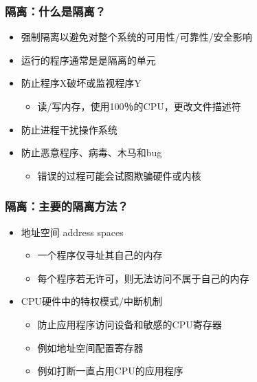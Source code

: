 \begin{frame}
	\frametitle{隔离：\small{什么是隔离？}}
		\begin{itemize}

		\item 强制隔离以避免对整个系统的可用性/可靠性/安全影响
		\item 运行的程序通常是是隔离的单元
		\pause
		
		\item 防止程序X破坏或监视程序Y
			\begin{itemize}
			\item 读/写内存，使用100％的CPU，更改文件描述符
			\end{itemize}
		\item 防止进程干扰操作系统
		\item 防止恶意程序、病毒、木马和bug
			\begin{itemize}
			\item 错误的过程可能会试图欺骗硬件或内核
			\end{itemize}
		\end{itemize}
\end{frame}



\begin{frame}
	\frametitle{隔离：\small{主要的隔离方法？}}
		\begin{itemize}
			\item 地址空间 address spaces
				\begin{itemize}
				\item 一个程序仅寻址其自己的内存
				\item 每个程序若无许可，则无法访问不属于自己的内存
				\end{itemize}			
				\pause
			
			\item CPU硬件中的特权模式/中断机制
				\begin{itemize}
				\item 防止应用程序访问设备和敏感的CPU寄存器
				\item 例如地址空间配置寄存器
				\item 例如打断一直占用CPU的应用程序
				\end{itemize}				
		\end{itemize}
\end{frame}

